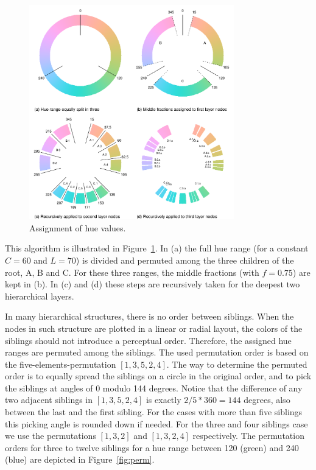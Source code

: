 \documentclass[journal]{vgtc}                %
\begin{document}
\begin{figure}[htb]
  \centering
  \includegraphics[width=3.5in]{hcl_method2.pdf}
  \caption{Assignment of hue values.}\label{fig:wheel}
\end{figure}

This algorithm is illustrated in Figure~\ref{fig:wheel}. In (a) the full hue range (for a constant $C=60$ and $L=70$)  is divided and permuted among the three children of the root, A, B and C. For these three ranges, the middle fractions (with $f=0.75$) are kept in (b).
In (c) and (d) these steps are recursively taken for the deepest two hierarchical layers.

In many hierarchical structures, there is no order between siblings. When the nodes in such structure are plotted in a linear or radial layout, the colors of the siblings should not introduce a perceptual order. Therefore, the assigned hue ranges are permuted among the siblings. The used permutation order is based on the five-elements-permutation $[1, 3, 5, 2, 4]$. The way to determine the permuted order is to equally spread the siblings on a circle in the original order, and to pick the siblings at angles of 0 modulo 144 degrees. Notice that the difference of any two adjacent siblings in $[1, 3, 5, 2, 4]$ is exactly $2/5 * 360=144$ degrees, also between the last and the first sibling. For the cases with more than five siblings this picking angle is rounded down if needed. For the three and four siblings case we use the permutations $[1, 3, 2]$ and $[1, 3, 2, 4]$ respectively. The permutation orders for three to twelve siblings for a hue range between 120 (green) and 240 (blue) are depicted in Figure~\ref{fig:perm}.
\end{document}
